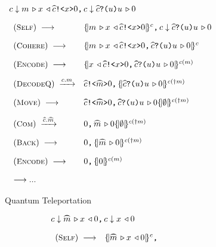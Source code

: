 \begin{figure}[t]
{\hspace*{-1em}
\begin{subfigure}[t]{0.57\textwidth}
{\footnotesize
\[
\begin{array}{l}
\pard{\down{c}{\encode{m}\decode{x}{\csend{\wideparen{c}}{x}{0}}}}{
\down{c}{\crev{\wideparen{c}}{u}{\encode{u}0}}
}
\\[1em]
\begin{array}{ll}
(\rulelab{Self})\;
\longrightarrow
&
\pard{\pscell{\encode{m}\decode{x}{\csend{\wideparen{c}}{x}{0}}}{c}}
{\down{c}{\crev{\wideparen{c}}{u}{\encode{u}0}}}

\\[1em]
(\rulelab{Cohere})\;
\longrightarrow
&
\pscell{\pard{\encode{m}\decode{x}{\csend{\wideparen{c}}{x}{0}}}{\crev{\wideparen{c}}{u}{\encode{u}0}}}{c}
\\[1em]
(\rulelab{Encode})\;
\longrightarrow
&
\pscell{\pard{{\decode{x}{\csend{\wideparen{c}}{x}{0}}}}{\crev{\wideparen{c}}{u}{\encode{u}0}}}{c(m)}
\\[1em]
(\rulelab{DecodeQ})\;
\xrightarrow{c.m}
&
\pard{\csend{\wideparen{c}}{\wideparen{m}}{0}}
{\pscell{{\crev{\wideparen{c}}{u}{\encode{u}0}}}{c(\up{m})}}
\\[1em]
(\rulelab{Move})\;
\longrightarrow
&
\pard{\csend{\wideparen{c}}{\wideparen{m}}{0}}
{{\crev{\wideparen{c}}{u}{\encode{u}0}}\pscell{\emptyset}{c(\up{m})}}
\\[1em]
(\rulelab{Com})\;
\xrightarrow{\wideparen{c}.\wideparen{m}}
&
\pard{0}
{{{\encode{\wideparen{m}}0}}\pscell{\emptyset}{c(\up{m})}}
\\[1em]
(\rulelab{Back})\;
\longrightarrow
&
\pard{0}
{\pscell{{{\encode{\wideparen{m}}0}}}{c(\up{m})}}
\\[1em]
(\rulelab{Encode})\;
\longrightarrow
&
\pard{0}
{\pscell{{{0}}}{c(m)}}
\\[1em]
\longrightarrow...
\end{array}
\end{array}
\]
}
\caption{Quantum Teleportation}
  \label{fig:tele-example}
\end{subfigure}
%
\begin{subfigure}[t]{0.38\textwidth}
{\footnotesize
\[
\begin{array}{l}
\pard{\down{c}{\encode{\wideparen{m}}\decode{x}{0}}}{
\down{c}{\decode{x}{0}}
}
\\[1em]
\begin{array}{ll}
(\rulelab{Self})\;
\longrightarrow
&
\pard{\pscell{\encode{\wideparen{m}}\decode{x}{0}}{c}}{
}
\end{array}
\end{array}\]}
\end{subfigure}}
\end{figure}
